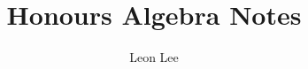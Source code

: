 \documentclass{article}
\title{Honours Algebra Notes}
\author{Leon Lee}
\begin{document}
\maketitle
\newpage
\tableofcontents
\newpage

\section{}
\subsection{}

%     
%
%     
%
%     
%
%     
\end{document}
